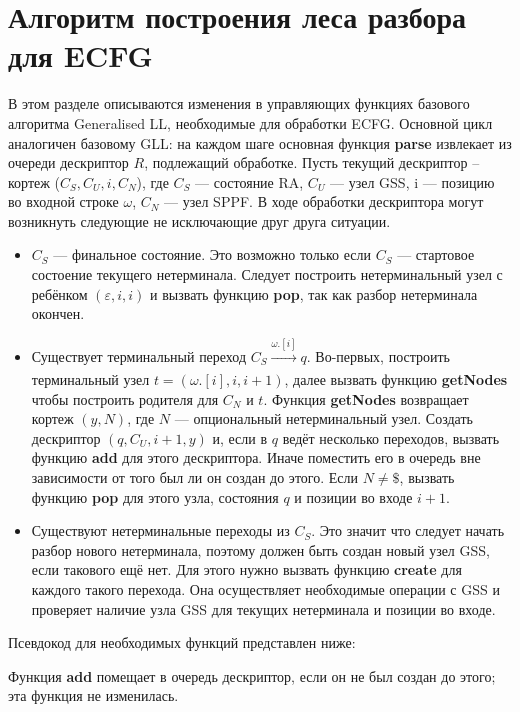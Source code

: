 \documentclass[14pt]{matmex-diploma-custom}
\begin{document}
	\section{Алгоритм построения леса разбора для ECFG}
	В этом разделе описываются изменения в управляющих функциях базового алгоритма 
	Generalised LL, необходимые для обработки ECFG. Основной цикл аналогичен базовому
	GLL: на каждом шаге основная функция \textbf{parse} извлекает из очереди дескриптор
	$R$, подлежащий обработке. Пусть текущий дескриптор -- кортеж ($C_S, C_U, i, C_N$),
	где $C_S$ --- состояние RA, $C_U$ --- узел GSS, i --- позицию во входной строке 
	$\omega$, $C_N$ --- узел SPPF. В ходе обработки дескриптора могут возникнуть следующие
	не исключающие друг друга ситуации.
	\begin{itemize} 
		\item $C_S$ --- финальное состояние. Это возможно только если $C_S$
		--- стартовое состоение текущего нетерминала. Следует построить нетерминальный
		узел с ребёнком $(\varepsilon, i, i)$ и вызвать функцию \textbf{pop}, так как
		разбор нетерминала окончен.
		
		\item Существует терминальный переход $C_S \xrightarrow[]{\omega.[i]} q$.
		Во-первых, построить терминальный узел $ t = (\omega.[i], i, i+1) $, далее 
		вызвать функцию \textbf{getNodes} чтобы построить родителя для $ C_N $ и $ t $. 
		Функция \textbf{getNodes} возвращает кортеж $ (y, N) $, где $N$ --- опциональный
		нетерминальный узел. Создать дескриптор $ (q, C_U, i+1, y) $ и, если
        в $q$ ведёт несколько переходов, вызвать функцию \textbf{add} для этого дескриптора.
        Иначе поместить его в очередь вне зависимости от того был ли он создан до этого. 
        Если $ N \neq \$$,
		вызвать функцию \textbf{pop} для этого узла, состояния $ q $ и позиции во
		входе $ i + 1 $.
		
		\item Существуют нетерминальные переходы из $C_S$.
		Это значит что следует начать разбор нового нетерминала, поэтому должен быть
		создан новый узел GSS, если такового ещё нет. Для этого нужно вызвать функцию
		\textbf{create} для каждого такого перехода. Она осуществляет необходимые
		операции с GSS и проверяет наличие узла GSS для текущих нетерминала и 
		позиции во входе.
	\end{itemize}
	Псевдокод для необходимых функций представлен ниже:
	
	Функция \textbf{add} помещает в очередь дескриптор, если он не был создан до этого; эта функция не изменилась.
	
	
\end{document}
